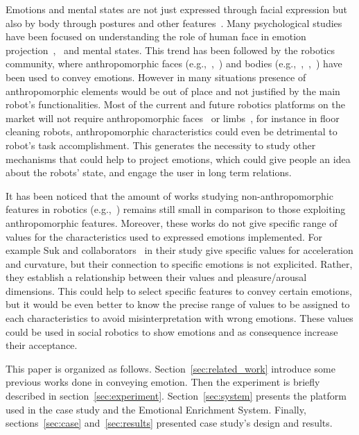 Emotions and mental states are not just expressed through facial expression but also by body through postures and other features~\cite{Gelder2008}. Many psychological studies have been focused on understanding the role of human face in emotion projection~\cite{Ekman2004},~\cite{kleinsmith2012affective} and mental states. This trend has been followed by the robotics community, where anthropomorphic faces (e.g.,~\cite{Arras2012},~\cite{Breazeal2002}) and bodies (e.g.,~\cite{Canamero2010},~\cite{haering2011},~\cite{Destephe2013}) have been used to convey emotions.
However in many situations presence of anthropomorphic elements would be out of place and not justified by the main robot's functionalities. Most of the current and future robotics platforms on the market will not require anthropomorphic faces~\cite{Breazeal2002} or limbs~\cite{Li2011}, for instance in floor cleaning robots, anthropomorphic characteristics could even be detrimental to robot's task accomplishment.
This generates the necessity to study other mechanisms that could help to project emotions, which could give people an idea about the robots' state, and engage the user in long term relations.

It has been noticed that the amount of works studying non-anthropomorphic features in robotics (e.g.,~\cite{Saerbeck2010,Lakatos2014,Sharma2013,Novika2015}) remains still small in comparison to those exploiting anthropomorphic features. Moreover, these works do not give specific range of values for the characteristics used to expressed  emotions implemented. For example Suk and collaborators~\cite{NAM2014} in their study give specific values for acceleration and curvature,  but their connection to specific emotions is not explicited. Rather, they establish a relationship between their values and pleasure/arousal dimensions. This could help to select specific features to convey certain emotions, but it would be even better to know the precise range of values to be assigned to each characteristics to avoid  misinterpretation with wrong emotions. These values could be used in social robotics to show emotions and as consequence increase their acceptance.

This paper is organized as follows. Section~\ref{sec:related_work} introduce some previous works done in conveying emotion. Then the experiment is briefly described in section~\ref{sec:experiment}. Section~\ref{sec:system} presents the platform used in the case study and the Emotional Enrichment System. Finally, sections~\ref{sec:case} and~\ref{sec:results} presented case study's design and results.